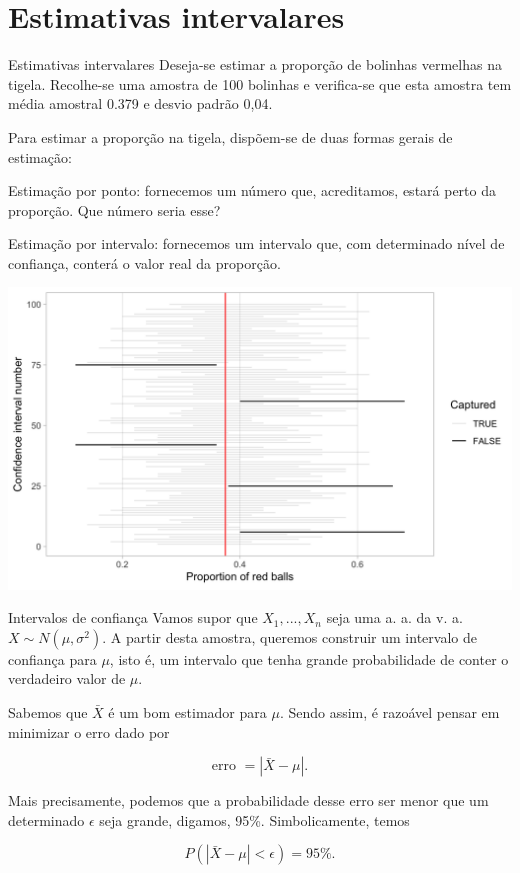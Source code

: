 \documentclass[
  9pt,
  ignorenonframetext,
  aspectratio=169]{beamer}
\begin{document}
\hypertarget{estimativas-intervalares}{%
\section{Estimativas intervalares}\label{estimativas-intervalares}}

\begin{frame}{Estimativas intervalares}
Deseja-se estimar a proporção de bolinhas vermelhas na tigela.
Recolhe-se uma amostra de 100 bolinhas e verifica-se que esta amostra
tem média amostral 0.379 e desvio padrão 0,04.

Para estimar a proporção na tigela, dispõem-se de duas formas gerais de
estimação:

Estimação por ponto: fornecemos um número que, acreditamos, estará perto
da proporção. Que número seria esse?

Estimação por intervalo: fornecemos um intervalo que, com determinado
nível de confiança, conterá o valor real da proporção.
\end{frame}

\begin{frame}{}
\protect\hypertarget{section-5}{}
\includegraphics{imgs/reliable-percentile-1.png}
\end{frame}

\begin{frame}{Intervalos de confiança}
\protect\hypertarget{intervalos-de-confianuxe7a}{}
Vamos supor que \(X_1, ..., X_n\) seja uma a. a. da v. a.
\(X \sim N(\mu, \sigma^2)\). A partir desta amostra, queremos construir
um intervalo de confiança para \(\mu\), isto é, um intervalo que tenha
grande probabilidade de conter o verdadeiro valor de \(\mu\).

Sabemos que \(\bar{X}\) é um bom estimador para \(\mu\). Sendo assim, é
razoável pensar em minimizar o erro dado por

\[
\text{erro } = |\bar{X} - \mu|.
\]

Mais precisamente, podemos que a probabilidade desse erro ser menor que
um determinado \(\epsilon\) seja grande, digamos, 95\%. Simbolicamente,
temos

\[
P(|\bar{X} - \mu| < \epsilon) = 95\%.
\]
\end{frame}
\end{document}

